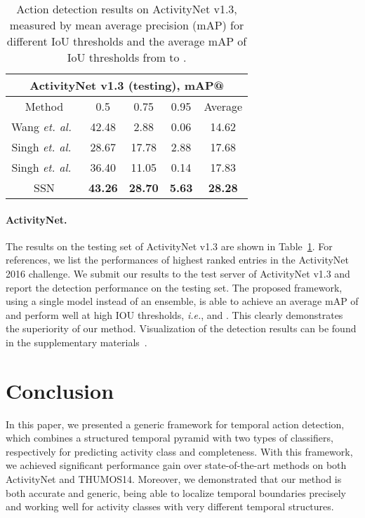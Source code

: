 \documentclass[10pt,twocolumn,letterpaper]{article}
\begin{document}
\begin{table}[t]
	\begin{center}
		\begin{tabular}{c|ccc|c}
			\hline
			\multicolumn{5}{c}{\textbf{ActivityNet v1.3} (testing),  \textbf{mAP@}}   \\ \hline
			Method & 0.5 & 0.75 & 0.95 &Average\\ \hline
			Wang \emph{et. al.}~\cite{UTS}  & 42.48 & 2.88 & 0.06 & 14.62 \\ \hline
			Singh \emph{et. al.}~\cite{Singh_2016_CVPR} & 28.67 & 17.78 & 2.88 & 17.68 \\ \hline
			Singh \emph{et. al.}~\cite{DBLP:journals/corr/SinghC16}& 36.40 & 11.05 & 0.14 & 17.83 \\ \hline\hline
			SSN & {\bf 43.26} & {\bf 28.70} & {\bf 5.63} &   {\bf 28.28}     \\ \hline
		\end{tabular}
	\end{center}
	\caption{\small
		Action detection results on ActivityNet v1.3, measured by mean average precision (mAP) for different IoU thresholds  and the average mAP of IoU thresholds from  to .
	}
	\label{table:anet_v1.3}
\vspace{-12pt}
\end{table}


\vspace{-12pt}
\paragraph{ActivityNet.}
The results on the testing set of ActivityNet v1.3 are shown in Table~\ref{table:anet_v1.3}.
For references, we list the performances of highest ranked entries in the ActivityNet 2016 challenge.
We submit our results to the test server of ActivityNet v1.3 and report the detection performance on the testing set.
The proposed framework, using a single model instead of an ensemble, is able to achieve an average mAP of  and perform well at high IOU thresholds, \emph{i.e.},  and .
This clearly demonstrates the superiority of our method.
Visualization of the detection results can be found in the supplementary materials~\cite{Supplement}.
 
\vspace{-5pt}
\section{Conclusion}
\label{sec:conclusion}
\vspace{-5pt}
In this paper, we presented a generic framework for temporal action detection,
which combines a structured temporal pyramid with two types of classifiers,
respectively for predicting activity class and completeness.
With this framework, we achieved significant performance gain over state-of-the-art
methods on both ActivityNet and THUMOS14.
Moreover, we demonstrated that our method is both accurate and generic,
being able to localize temporal boundaries precisely and working well
for activity classes with very different temporal structures.
\vspace{-15pt}
\end{document}
